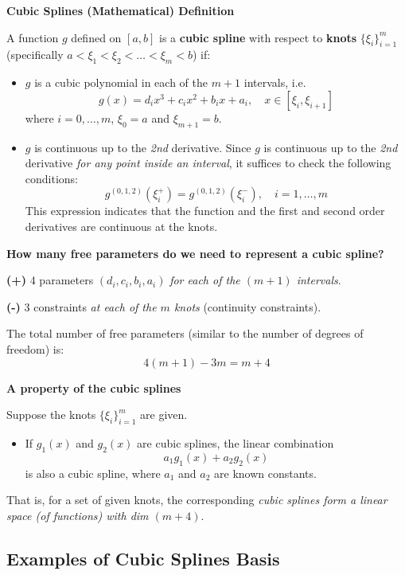 \documentclass[
]{book}
\providecommand{\tightlist}{%
  \setlength{\itemsep}{0pt}\setlength{\parskip}{0pt}}
\begin{document}
\textbf{Cubic Splines (Mathematical) Definition}

A function \(g\) defined on \([a,b]\) is a \textbf{cubic spline} with respect to \textbf{knots} \(\{\xi_i\}_{i=1}^m\) (specifically \(a<\xi_1<\xi_2<\ldots<\xi_m<b\)) if:

\begin{itemize}
\item
  \(g\) is a cubic polynomial in each of the \(m+1\) intervals, i.e.
  \[g(x) =d_ix^3+c_ix^2+b_ix+a_i,\quad x\in [\xi_i,\xi_{i+1}]\]
  where \(i=0,\ldots, m\), \(\xi_0=a\) and \(\xi_{m+1}=b\).
\item
  \(g\) is continuous up to the \emph{2nd} derivative. Since \(g\) is continuous up to the \emph{2nd} derivative \emph{for any point inside an interval}, it suffices to check the following conditions:
  \[g^{(0,1,2)} (\xi_i^+)=g^{(0,1,2)}(\xi_i^-),\quad i=1, \ldots, m\]
  This expression indicates that the function and the first and second order derivatives are continuous at the knots.
\end{itemize}

\textbf{How many free parameters do we need to represent a cubic spline?}

\textbf{(+)} 4 parameters \((d_i,c_i,b_i,a_i)\) \emph{for each of the \((m+1)\) intervals}.

\textbf{(-)} 3 constraints \emph{at each of the \(m\) knots} (continuity constraints).

The total number of free parameters (similar to the number of degrees of freedom) is:
\[4(m+1) - 3m = m + 4\]

\textbf{A property of the cubic splines}

Suppose the knots \(\{\xi_i\}_{i=1}^m\) are given.

\begin{itemize}
\tightlist
\item
  If \(g_1(x)\) and \(g_2(x)\) are cubic splines, the linear combination
  \[a_1g_1(x)+a_2g_2(x)\]
  is also a cubic spline, where \(a_1\) and \(a_2\) are known constants.
\end{itemize}

That is, for a set of given knots, the corresponding \emph{cubic splines form a linear space (of functions) with dim \((m + 4)\)}.

\subsection{Examples of Cubic Splines Basis}\label{examples-of-cubic-splines-basis}
\end{document}
